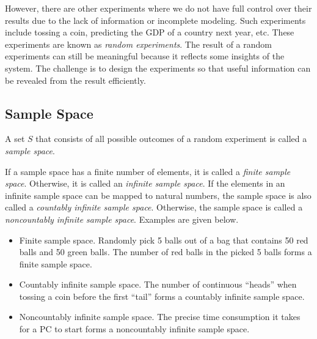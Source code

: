 However, there are other experiments where we do not have full control over their results due to the lack of information or incomplete modeling. Such experiments include tossing a coin, predicting the GDP of a country next year, etc. These experiments are known as \textit{random experiments}. The result of a random experiments can still be meaningful because it reflects some insights of the system. The challenge is to design the experiments so that useful information can be revealed from the result efficiently.

\subsection{Sample Space}

A set $S$ that consists of all possible outcomes of a random experiment is called a \textit{sample space}.

If a sample space has a finite number of elements, it is called a \textit{finite sample space}. Otherwise, it is called an \textit{infinite sample space}. If the elements in an infinite sample space can be mapped to natural numbers, the sample space is also called a \textit{countably infinite sample space}. Otherwise, the sample space is called a \textit{noncountably infinite sample space}. Examples are given below.
\begin{itemize}
	\item Finite sample space. Randomly pick 5 balls out of a bag that contains 50 red balls and 50 green balls. The number of red balls in the picked 5 balls forms a finite sample space.
	\item Countably infinite sample space. The number of continuous ``heads'' when tossing a coin before the first ``tail'' forms a countably infinite sample space.
	\item Noncountably infinite sample space. The precise time consumption it takes for a PC to start forms a noncountably infinite sample space.
\end{itemize}

